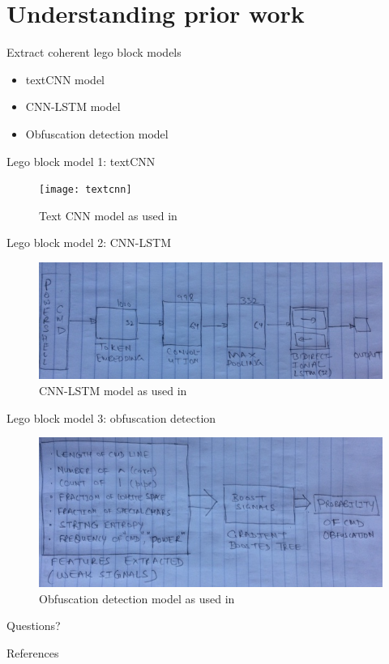 \documentclass[10pt]{beamer}
\begin{document}
\section{Understanding prior work}

\begin{frame}[fragile]{Extract coherent lego block models}
	\begin{itemize}
		\item textCNN model \cite{textcnn2016,textcnn2019,powershell2018}
		\item CNN-LSTM model \cite{amsi2019}
		\item Obfuscation detection model \cite{feye2018}
	\end{itemize}
\end{frame}

\begin{frame}[fragile]{Lego block model 1: textCNN}
	\begin{figure}
		\texttt{[image: textcnn]}
		\caption{Text CNN model as used in \cite{powershell2018}}
	\end{figure}
\end{frame}

\begin{frame}[fragile]{Lego block model 2: CNN-LSTM}
	\begin{figure}
		\includegraphics[scale=0.50]{cnn-lstm}
		\caption{CNN-LSTM model as used in \cite{amsi2019}}
	\end{figure}
\end{frame}

\begin{frame}[fragile]{Lego block model 3: obfuscation detection}
	\begin{figure}
		\includegraphics[scale=0.50]{gbtree}
		\caption{Obfuscation detection model as used in \cite{feye2018}}
	\end{figure}
\end{frame}

\begin{frame}[standout]
  Questions?
\end{frame}

\appendix

\begin{frame}[allowframebreaks]{References}

  
  

\end{frame}
\end{document}
